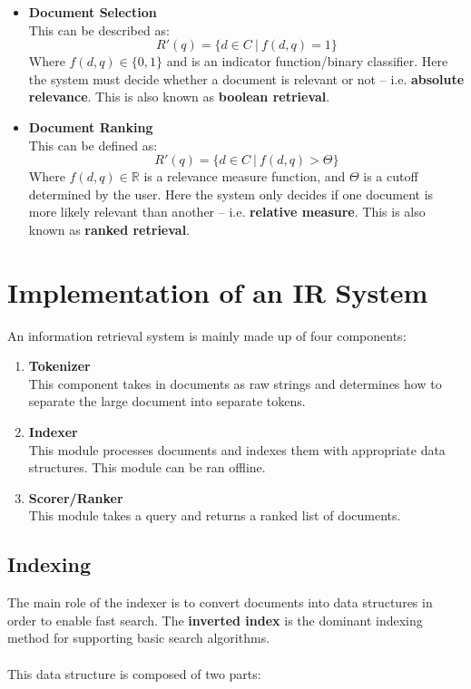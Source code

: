 \documentclass{article}
\begin{document}
\begin{itemize}
	\item \textbf{Document Selection}
	\vspace{.2cm} \\
	This can be described as:
	\[ R'(q) = \{ d \in C~|~f(d, q) = 1 \} \]
	Where $f(d, q) \in \{0,1\}$ and is an indicator function/binary classifier. Here the system must decide whether a document is relevant or not -- i.e. \textbf{absolute relevance}. This is also known as \textbf{boolean retrieval}.
	
	\item \textbf{Document Ranking}
	\vspace{.2cm} \\	
	This can be defined as:
	\[ R'(q) = \{ d \in C~|~f(d,q) > \Theta\} \]
	Where $f(d,q) \in \mathbb{R}$ is a relevance measure function, and $\Theta$ is a cutoff determined by the user. Here the system only decides if one document is more likely relevant than another -- i.e. \textbf{relative measure}. This is also known as \textbf{ranked retrieval}.
\end{itemize}

\section{Implementation of an IR System}
An information retrieval system is mainly made up of four components:

\begin{enumerate}
	\item \textbf{Tokenizer}
	\vspace{.2cm} \\
	This component takes in documents as raw strings and determines how to separate the large document into separate tokens.
	
	\item \textbf{Indexer}
	\vspace{.2cm} \\
	This module processes documents and indexes them with appropriate data structures. This module can be ran offline.
	
	\item \textbf{Scorer/Ranker}
	\vspace{.2cm} \\
	This module takes a query and returns a ranked list of documents.
\end{enumerate}

\subsection{Indexing}
The main role of the indexer is to convert documents into data structures in order to enable fast search. The \textbf{inverted index} is the dominant indexing method for supporting basic search algorithms. \\ \\
This data structure is composed of two parts:
\end{document}
